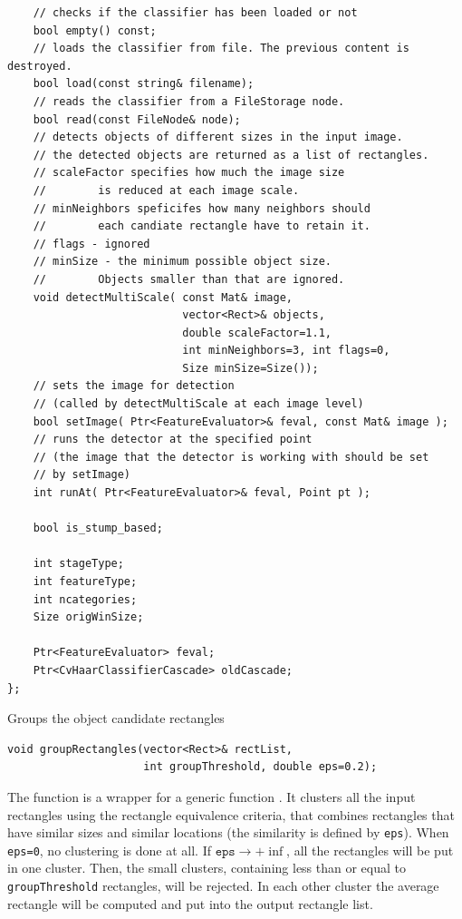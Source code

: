 \begin{description}
\begin{lstlisting}
    // checks if the classifier has been loaded or not
    bool empty() const;
    // loads the classifier from file. The previous content is destroyed.
    bool load(const string& filename);
    // reads the classifier from a FileStorage node.
    bool read(const FileNode& node);
    // detects objects of different sizes in the input image.
    // the detected objects are returned as a list of rectangles.
    // scaleFactor specifies how much the image size
    //        is reduced at each image scale.
    // minNeighbors speficifes how many neighbors should
    //        each candiate rectangle have to retain it.
    // flags - ignored
    // minSize - the minimum possible object size.
    //        Objects smaller than that are ignored.
    void detectMultiScale( const Mat& image,
                           vector<Rect>& objects,
                           double scaleFactor=1.1,
                           int minNeighbors=3, int flags=0,
                           Size minSize=Size());
    // sets the image for detection
    // (called by detectMultiScale at each image level)
    bool setImage( Ptr<FeatureEvaluator>& feval, const Mat& image );
    // runs the detector at the specified point
    // (the image that the detector is working with should be set
    // by setImage)
    int runAt( Ptr<FeatureEvaluator>& feval, Point pt );

    bool is_stump_based;

    int stageType;
    int featureType;
    int ncategories;
    Size origWinSize;

    Ptr<FeatureEvaluator> feval;
    Ptr<CvHaarClassifierCascade> oldCascade;
};
\end{lstlisting}

\label{groupRectangles}
Groups the object candidate rectangles

\begin{lstlisting}
void groupRectangles(vector<Rect>& rectList,
                     int groupThreshold, double eps=0.2);
\end{lstlisting}
\begin{description}
\end{description}

The function is a wrapper for a generic function . It clusters all the input rectangles using the rectangle equivalence criteria, that combines rectangles that have similar sizes and similar locations (the similarity is defined by \texttt{eps}). When \texttt{eps=0}, no clustering is done at all. If $\texttt{eps}\rightarrow +\inf$, all the rectangles will be put in one cluster. Then, the small clusters, containing less than or equal to \texttt{groupThreshold} rectangles, will be rejected. In each other cluster the average rectangle will be computed and put into the output rectangle list.  


\end{description}
